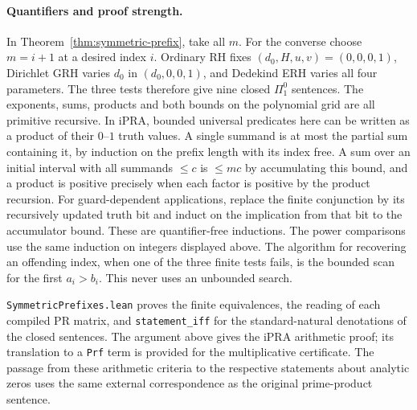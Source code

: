 \paragraph{Quantifiers and proof strength.}
In Theorem~\ref{thm:symmetric-prefix}, take all $m$. For the converse choose $m=i+1$ at a desired index $i$. Ordinary RH fixes $(d_0,H,u,v)=(0,0,0,1)$, Dirichlet GRH varies $d_0$ in $(d_0,0,0,1)$, and Dedekind ERH varies all four parameters. The three tests therefore give nine closed $\Pi^0_1$ sentences. The exponents, sums, products and both bounds on the polynomial grid are all primitive recursive. In iPRA, bounded universal predicates here can be written as a product of their $0$--$1$ truth values. A single summand is at most the partial sum containing it, by induction on the prefix length with its index free. A sum over an initial interval with all summands $\le c$ is $\le mc$ by accumulating this bound, and a product is positive precisely when each factor is positive by the product recursion. For guard-dependent applications, replace the finite conjunction by its recursively updated truth bit and induct on the implication from that bit to the accumulator bound. These are quantifier-free inductions. The power comparisons use the same induction on integers displayed above. The algorithm for recovering an offending index, when one of the three finite tests fails, is the bounded scan for the first $a_i>b_i$. This never uses an unbounded search.

\texttt{SymmetricPrefixes.lean} proves the finite equivalences, the reading of each compiled PR matrix, and \texttt{statement\_iff} for the standard-natural denotations of the closed sentences. The argument above gives the iPRA arithmetic proof; its translation to a \texttt{Prf} term is provided for the multiplicative certificate. The passage from these arithmetic criteria to the respective statements about analytic zeros uses the same external correspondence as the original prime-product sentence.
